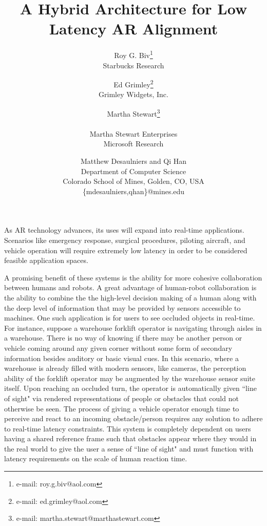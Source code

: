 \documentclass{vgtc}                          %
\title{A Hybrid Architecture for Low Latency AR Alignment}
\author{Roy G. Biv\thanks{e-mail: roy.g.biv@aol.com}\\ %
        \scriptsize Starbucks Research %
\and Ed Grimley\thanks{e-mail: ed.grimley@aol.com}\\ %
     \scriptsize Grimley Widgets, Inc. %
\and Martha Stewart\thanks{e-mail: martha.stewart@marthastewart.com}\\ %
     \parbox{1.4in}{\scriptsize \centering Martha Stewart Enterprises \\ Microsoft Research}}
\author{Matthew Desaulniers and Qi Han\\ 
Department of Computer Science \\
Colorado School of Mines, Golden, CO, USA \\
\{mdesaulniers,qhan\}@mines.edu}
\begin{document}


\maketitle


As AR technology advances, its uses will expand into real-time applications. Scenarios like 
emergency response, surgical procedures, piloting aircraft, and vehicle operation will require extremely low latency 
in order to be considered feasible application spaces. 

A promising benefit of these systems is the ability for more cohesive collaboration between humans and robots. A great advantage 
of human-robot collaboration is the ability to combine the the high-level decision making of a human along with the deep level of 
information that may be provided by sensors accessible to machines. One such application is for users to see occluded objects in 
real-time. For instance, suppose a warehouse forklift operator is navigating through 
aisles in a warehouse. There is no way of knowing if there may be another person or vehicle coming around any given corner
without some form of secondary information besides auditory or basic visual cues. In this scenario, where a warehouse 
is already filled with modern sensors, like cameras, the perception ability of the forklift operator may be augmented 
by the warehouse sensor suite itself. Upon reaching an occluded turn, the operator is automatically given ``line of sight" 
via rendered representations of people or obstacles that could not otherwise be seen. The process of giving a vehicle operator 
enough time to perceive and react to an incoming obstacle/person requires any solution to adhere to 
real-time latency constraints. This system is completely dependent 
on users having a shared reference frame such that obstacles appear where they would in the real world to give the user
a sense of ``line of sight" and must function with latency requirements on the scale of human
reaction time. 
\end{document}
